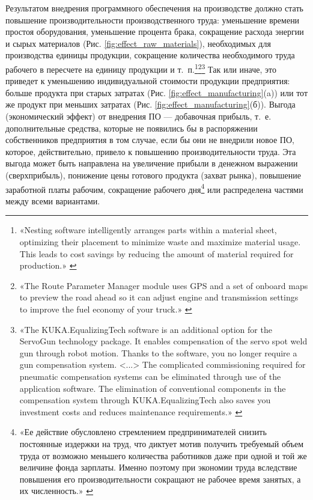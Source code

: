 \documentclass{article}
\begin{document}
Результатом внедрения программного обеспечения на производстве должно стать повышение производительности производственного труда: уменьшение времени простоя оборудования, уменьшение процента брака, сокращение расхода энергии и сырых материалов (Рис. \ref{fig:effect_raw_materials}), необходимых для производства единицы продукции, сокращение количества необходимого труда рабочего в пересчете на единицу продукции и т. п.\footnote{«Nesting software intelligently arranges parts within a material sheet, optimizing their placement to minimize waste and maximize material usage. This leads to cost savings by reducing the amount of material required for production.» \cite{autodeskNesting}}\footnote{«The Route Parameter Manager module uses GPS and a set of onboard maps to preview the road ahead so it can adjust engine and transmission settings to improve the fuel economy of your truck.» \cite{cumminsAdept}}\footnote{«The KUKA.EqualizingTech software is an additional option for the ServoGun technology package. It enables compensation of the servo spot weld gun through robot motion. Thanks to the software, you no longer require a gun compensation system. <...> The complicated commissioning required for pneumatic compensation systems can be eliminated through use of the application software. The elimination of conventional components in the compensation system through KUKA.EqualizingTech also saves you investment costs and reduces maintenance requirements.» \cite{kukaEqulizingTech}} Так или иначе, это приведет к уменьшению индивидуальной стоимости продукции предприятия: больше продукта при старых затратах (Рис. \ref{fig:effect_manufacturing}(a)) или тот же продукт при меньших затратах (Рис. \ref{fig:effect_manufacturing}(б)). Выгода (экономический эффект) от внедрения ПО — добавочная прибыль, т. е. дополнительные средства, которые не появились бы в распоряжении собственников предприятия в том случае, если бы они не внедрили новое ПО, которое, действительно, привело к повышению производительности труда. Эта выгода может быть направлена на увеличение прибыли в денежном выражении (сверхприбыль), понижение цены готового продукта (захват рынка), повышение заработной платы рабочим, сокращение рабочего дня\footnote{«Ее действие обусловлено стремлением предпринимателей снизить постоянные издержки на труд, что диктует мотив получить требуемый объем труда от возможно меньшего количества работников даже при одной и той же величине фонда зарплаты. Именно поэтому при экономии труда вследствие повышения его производительности сокращают не рабочее время занятых, а их численность.» \cite{workingTime2020}} или распределена частями между всеми вариантами.
\end{document}

